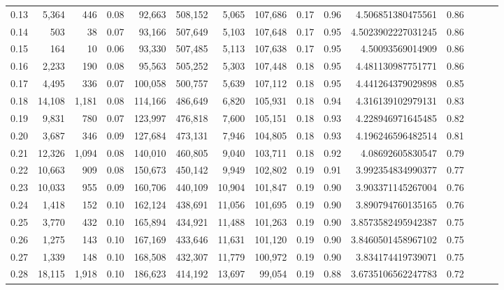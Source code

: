 \begin{tabular}{rrrrrrrrrrrrrrr}
0.13 &   5,364 &     446 &  0.08 &   92,663 &  508,152 &    5,065 &  107,686 &  0.17 &  0.96 &     4.506851380475561 &      0.86 \\
0.14 &     503 &      38 &  0.07 &   93,166 &  507,649 &    5,103 &  107,648 &  0.17 &  0.95 &    4.5023902227031245 &      0.86 \\
0.15 &     164 &      10 &  0.06 &   93,330 &  507,485 &    5,113 &  107,638 &  0.17 &  0.95 &      4.50093569014909 &      0.86 \\
0.16 &   2,233 &     190 &  0.08 &   95,563 &  505,252 &    5,303 &  107,448 &  0.18 &  0.95 &     4.481130987751771 &      0.86 \\
0.17 &   4,495 &     336 &  0.07 &  100,058 &  500,757 &    5,639 &  107,112 &  0.18 &  0.95 &     4.441264379029898 &      0.85 \\
0.18 &  14,108 &   1,181 &  0.08 &  114,166 &  486,649 &    6,820 &  105,931 &  0.18 &  0.94 &     4.316139102979131 &      0.83 \\
0.19 &   9,831 &     780 &  0.07 &  123,997 &  476,818 &    7,600 &  105,151 &  0.18 &  0.93 &     4.228946971645485 &      0.82 \\
0.20 &   3,687 &     346 &  0.09 &  127,684 &  473,131 &    7,946 &  104,805 &  0.18 &  0.93 &     4.196246596482514 &      0.81 \\
0.21 &  12,326 &   1,094 &  0.08 &  140,010 &  460,805 &    9,040 &  103,711 &  0.18 &  0.92 &      4.08692605830547 &      0.79 \\
0.22 &  10,663 &     909 &  0.08 &  150,673 &  450,142 &    9,949 &  102,802 &  0.19 &  0.91 &     3.992354834990377 &      0.77 \\
0.23 &  10,033 &     955 &  0.09 &  160,706 &  440,109 &   10,904 &  101,847 &  0.19 &  0.90 &     3.903371145267004 &      0.76 \\
0.24 &   1,418 &     152 &  0.10 &  162,124 &  438,691 &   11,056 &  101,695 &  0.19 &  0.90 &     3.890794760135165 &      0.76 \\
0.25 &   3,770 &     432 &  0.10 &  165,894 &  434,921 &   11,488 &  101,263 &  0.19 &  0.90 &    3.8573582495942387 &      0.75 \\
0.26 &   1,275 &     143 &  0.10 &  167,169 &  433,646 &   11,631 &  101,120 &  0.19 &  0.90 &    3.8460501458967102 &      0.75 \\
0.27 &   1,339 &     148 &  0.10 &  168,508 &  432,307 &   11,779 &  100,972 &  0.19 &  0.90 &     3.834174419739071 &      0.75 \\
0.28 &  18,115 &   1,918 &  0.10 &  186,623 &  414,192 &   13,697 &   99,054 &  0.19 &  0.88 &    3.6735106562247783 &      0.72 \\

\end{tabular}
